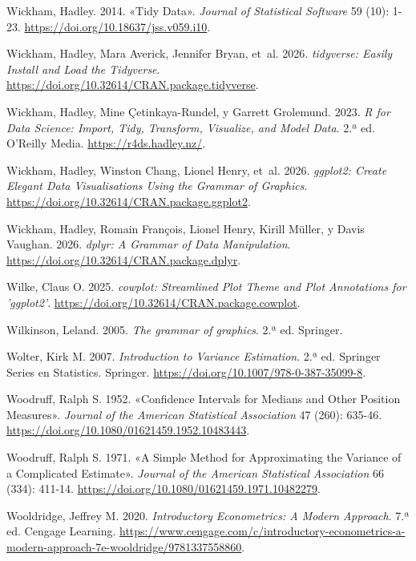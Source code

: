 \documentclass[
  spanish,
  11pt,
  letterpaper,
  oneside,
  open=any]{scrbook}
\newlength{\cslhangindent}
\newenvironment{CSLReferences}[2] %
 {\begin{list}{}{%
  \setlength{\itemindent}{0pt}
  \setlength{\leftmargin}{0pt}
  \setlength{\parsep}{0pt}
  \ifodd #1
   \setlength{\leftmargin}{\cslhangindent}
   \setlength{\itemindent}{-1\cslhangindent}
  \fi
  \setlength{\itemsep}{#2\baselineskip}}}
 {\end{list}}
\begin{document}
\begin{CSLReferences}{1}{1}
Wickham, Hadley. 2014. {«Tidy Data»}. \emph{Journal of Statistical
Software} 59 (10): 1-23. \url{https://doi.org/10.18637/jss.v059.i10}.

Wickham, Hadley, Mara Averick, Jennifer Bryan, et~al. 2026.
\emph{tidyverse: Easily Install and Load the Tidyverse}.
\url{https://doi.org/10.32614/CRAN.package.tidyverse}.

Wickham, Hadley, Mine Çetinkaya-Rundel, y Garrett Grolemund. 2023.
\emph{R for Data Science: Import, Tidy, Transform, Visualize, and Model
Data}. 2.ª ed. O'Reilly Media. \url{https://r4ds.hadley.nz/}.

Wickham, Hadley, Winston Chang, Lionel Henry, et~al. 2026.
\emph{ggplot2: Create Elegant Data Visualisations Using the Grammar of
Graphics}. \url{https://doi.org/10.32614/CRAN.package.ggplot2}.

Wickham, Hadley, Romain François, Lionel Henry, Kirill Müller, y Davis
Vaughan. 2026. \emph{dplyr: A Grammar of Data Manipulation}.
\url{https://doi.org/10.32614/CRAN.package.dplyr}.

Wilke, Claus O. 2025. \emph{cowplot: Streamlined Plot Theme and Plot
Annotations for 'ggplot2'}.
\url{https://doi.org/10.32614/CRAN.package.cowplot}.

Wilkinson, Leland. 2005. \emph{The grammar of graphics}. 2.ª ed.
Springer.

Wolter, Kirk M. 2007. \emph{Introduction to Variance Estimation}. 2.ª
ed. Springer Series en Statistics. Springer.
\url{https://doi.org/10.1007/978-0-387-35099-8}.

Woodruff, Ralph S. 1952. {«Confidence Intervals for Medians and Other
Position Measures»}. \emph{Journal of the American Statistical
Association} 47 (260): 635-46.
\url{https://doi.org/10.1080/01621459.1952.10483443}.

Woodruff, Ralph S. 1971. {«A Simple Method for Approximating the
Variance of a Complicated Estimate»}. \emph{Journal of the American
Statistical Association} 66 (334): 411-14.
\url{https://doi.org/10.1080/01621459.1971.10482279}.

Wooldridge, Jeffrey M. 2020. \emph{Introductory Econometrics: A Modern
Approach}. 7.ª ed. Cengage Learning.
\url{https://www.cengage.com/c/introductory-econometrics-a-modern-approach-7e-wooldridge/9781337558860}.

\end{CSLReferences}


\backmatter
\end{document}
